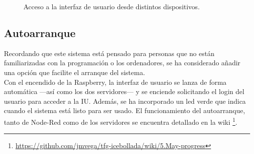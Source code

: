 \begin{figure}[h!]
  \begin{center}
    \hspace{2mm}
  \end{center}
\caption{Acceso a la interfaz de usuario desde distintos dispositivos.} \label{fig:userlogin}
\end{figure}

\subsection{Autoarranque}
Recordando que este sistema está pensado para personas que no están familiarizadas con la programación o los ordenadores, se ha considerado añadir una opción que facilite el arranque del sistema.\\

Con el encendido de la Raspberry, la interfaz de usuario se lanza de forma automática ---así como los dos servidores--- y se enciende solicitando el login del usuario para acceder a la IU. Además, se ha incorporado un led verde que indica cuando el sistema está listo para ser usado. El funcionamiento del autoarranque, tanto de Node-Red como de los servidores se encuentra detallado en la wiki \footnote{\url{https://github.com/jmvega/tfg-icebollada/wiki/5.May-progress}}.